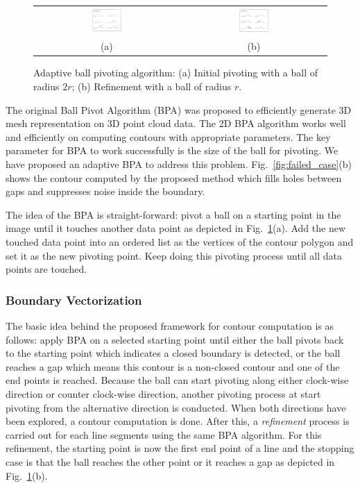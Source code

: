 \documentclass[10pt,journal,cspaper,compsoc]{IEEEtran}
\newcommand{\Figa}[1]{Fig.~\ref{fig:#1}(a)}
\newcommand{\Figb}[1]{Fig.~\ref{fig:#1}(b)}
\begin{document}
\begin{figure}[hbtp]
\begin{center}
\begin{tabular}{cc}
\includegraphics[width=0.24\textwidth]{BPA_init.pdf} &
\includegraphics[width=0.24\textwidth]{BPA_refine.pdf} \\
(a) & (b)
\end{tabular}
\end{center}
\caption{Adaptive ball pivoting algorithm:
(a) Initial pivoting with a ball of radius 2$r$;
(b) Refinement with a ball of radius $r$.}
\label{fig:BPA}
\end{figure}


The original Ball Pivot Algorithm (BPA) was proposed to efficiently 
generate 3D mesh representation on 3D point cloud data.
The 2D BPA algorithm works well and efficiently on 
computing contours with appropriate parameters.
The key parameter for BPA to work successfully is 
the size of the ball for pivoting.
We have proposed an adaptive BPA to address this problem.
\Figb{failed_case} shows
the contour computed by the proposed method which fills holes between gaps
and suppresses noise inside the boundary.

The idea of the BPA is straight-forward:
pivot a ball on a starting point in the image
until it touches another data point as depicted in \Figa{BPA}.
Add the new touched
data point into an ordered list as the vertices of the contour polygon and
set it as the new pivoting point.
Keep doing this pivoting process until all data points are touched.

\subsubsection{Boundary Vectorization}

The basic idea behind the proposed framework 
for contour computation is as follows:
apply BPA on a selected starting point until
either the ball pivots back to the starting point 
which indicates a closed boundary is detected,
or the ball reaches a gap which means this contour is a non-closed
contour and one of the end points is reached.
Because the ball can start pivoting along either clock-wise direction 
or counter clock-wise direction,
another pivoting process at start pivoting from 
the alternative direction is conducted.
When both directions have been explored, 
a contour computation is done.
After this, a {\it refinement} process is carried out 
for each line segments using the same BPA algorithm.
For this refinement, the starting point is now 
the first end point of a line
and the stopping case is that the ball reaches the other point 
or it reaches a gap as depicted in \Figb{BPA}.
\end{document}
